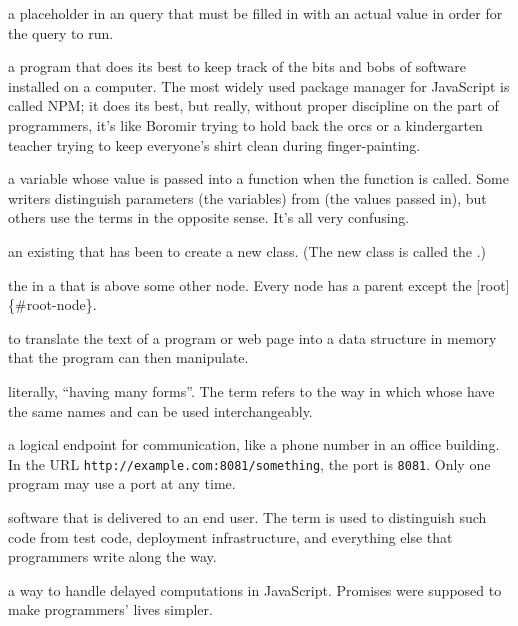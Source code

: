 \begin{description}
a placeholder in an  query that must be filled in with an actual
value in order for the query to run.

a program that does its best to keep track of the bits and bobs of software
installed on a computer. The most widely used package manager for JavaScript
is called NPM; it does its best, but really, without proper discipline on the
part of programmers, it's like Boromir trying to hold back the orcs or a
kindergarten teacher trying to keep everyone's shirt clean during
finger-painting.

a variable whose value is passed into a function when the function is called.
Some writers distinguish parameters (the variables) from
 (the values passed in), but others use the terms in
the opposite sense. It's all very confusing.

an existing  that has been  to create a
new class. (The new class is called the .)

the  in a  that is above some other node. Every
node has a parent except the {[}root{]}\{\#root-node\}.

to translate the text of a program or web page into a data structure in memory
that the program can then manipulate.

literally, ``having many forms''. The term refers to the way in which
 whose  have the same names and
 can be used interchangeably.

a logical endpoint for communication, like a phone number in an office
building. In the URL \texttt{http://example.com:8081/something}, the port is \texttt{8081}.
Only one program may use a port at any time.

software that is delivered to an end user. The term is used to distinguish
such code from test code, deployment infrastructure, and everything else that
programmers write along the way.

a way to handle delayed computations in JavaScript. Promises were supposed to
make programmers' lives simpler.


\end{description}
